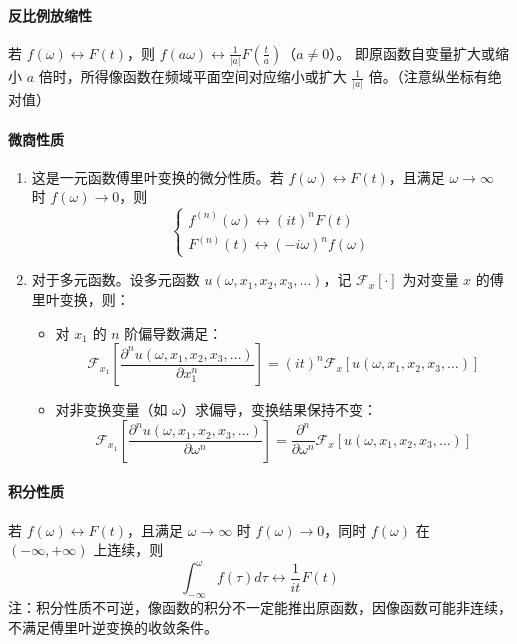 \documentclass{article}
\begin{document}
	\paragraph{反比例放缩性}
	若 \( f(\omega) \leftrightarrow F(t) \)，则 \( f(a\omega) \leftrightarrow \frac{1}{|a|}F\left( \frac{t}{a} \right) \)（\( a \neq 0 \)）。
	即原函数自变量扩大或缩小 \( a \) 倍时，所得像函数在频域平面空间对应缩小或扩大 \( \frac{1}{|a|} \) 倍。（注意纵坐标有绝对值）
	
	\paragraph{微商性质}
	\begin{enumerate}[label=\arabic*.]
		\item 这是一元函数傅里叶变换的微分性质。若 \( f(\omega) \leftrightarrow F(t) \)，且满足 \( \omega \to \infty \) 时 \( f(\omega) \to 0 \)，则
		\[
		\begin{cases} 
			f^{(n)}(\omega) \leftrightarrow (it)^n F(t) \\
			F^{(n)}(t) \leftrightarrow (-i\omega)^n f(\omega)
		\end{cases}
		\]
		\item 对于多元函数。设多元函数 \( u(\omega, x_1, x_2, x_3, \dots) \)，记 \( \mathcal{F}_x[\cdot] \) 为对变量 \( x \) 的傅里叶变换，则：
		\begin{itemize}
			\item 对 \( x_1 \) 的 \( n \) 阶偏导数满足：
			\[
			\mathcal{F}_{x_1}\left[ \frac{\partial^n  u(\omega, x_1, x_2, x_3, \dots)}{\partial x_1^n} \right] = (it)^n \mathcal{F}_x\left[  u(\omega, x_1, x_2, x_3, \dots) \right]
			\]
			\item 对非变换变量（如 \( \omega \)）求偏导，变换结果保持不变：
			\[
			\mathcal{F}_{x_1}\left[ \frac{\partial^n  u(\omega, x_1, x_2, x_3, \dots)}{\partial \omega^n} \right] = \frac{\partial^n}{\partial \omega^n} \mathcal{F}_x\left[  u(\omega, x_1, x_2, x_3, \dots) \right]
			\]
		\end{itemize}
	\end{enumerate}
	
	\paragraph{积分性质}
	若 \( f(\omega) \leftrightarrow F(t) \)，且满足 \( \omega \to \infty \) 时 \( f(\omega) \to 0 \)，同时 \( f(\omega) \) 在 \( (-\infty,+\infty) \) 上连续，则
	\[
	\int_{-\infty}^\omega f(\tau) d\tau \leftrightarrow \frac{1}{it} F(t)
	\]
	注：积分性质不可逆，像函数的积分不一定能推出原函数，因像函数可能非连续，不满足傅里叶逆变换的收敛条件。
	
\end{document}
